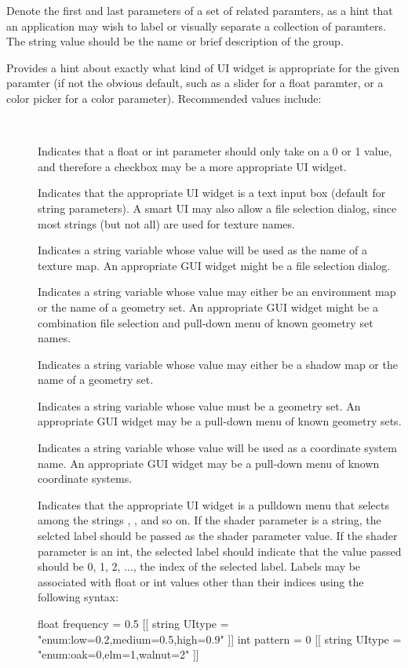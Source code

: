 \documentclass[11pt,letterpaper]{book}
\def\color{{\cf color}\xspace}
\def\float{{\cf float}\xspace}
\def\inttype{{\cf int}\xspace}
\begin{document}
Denote the first and last parameters of a set of related paramters, as a
hint that an application may wish to label or visually separate a
collection of paramters.  The string value should be the name or brief
description of the group.
\apiend

Provides a hint about exactly what kind of UI widget is appropriate for
the given paramter (if not the obvious default, such as a slider for a
\float paramter, or a color picker for a \color parameter).  Recommended
values include:

\vspace{-12pt}
\begin{description}
\item[] \spc
\item[\rm \halfspc ~ ] Indicates that a \float or {\cf int}
  parameter should only take on a 0 or 1 value, and therefore a checkbox
  may be a more appropriate UI widget.
\item[\rm {}] Indicates that the appropriate UI widget is a text
  input box (default for string parameters).  A smart UI may also allow
  a file selection dialog, since most strings (but not all) are used
  for texture names.
\item[\rm {}] Indicates a string variable whose value will be
  used as the name of a texture map.  An appropriate GUI widget might
  be a file selection dialog.
\item[\rm {}] Indicates a string variable whose value may
  either be an environment map or the name of a geometry set.  An
  appropriate GUI widget might be a combination file selection and
  pull-down menu of known geometry set names.
\item[\rm {}] Indicates a string variable whose value may
  either be a shadow map or the name of a geometry set.
\item[\rm {}] Indicates a string variable whose value must
  be a geometry set.  An appropriate GUI widget may be a pull-down
  menu of known geometry sets.
\item[\rm {}] Indicates a string variable whose value will be
  used as a coordinate system name.  An appropriate GUI widget may be
  a pull-down menu of known coordinate systems.
\item[\rm {}] Indicates that the appropriate UI
  widget is a pulldown menu that selects among the strings ,
  , and so on.
  If the shader parameter is a {\cf string}, the selcted label should be
  passed as the shader parameter value.  If the shader parameter is an
  \inttype, the selected label should indicate that the value passed
  should be 0, 1, 2, ..., the index of the selected label.
  Labels may be associated with \float or {\cf int} values other than
  their indices using the following syntax:
  \begin{code}
    float frequency = 0.5
        [[ string UItype = "enum:low=0.2,medium=0.5,high=0.9" ]]
    int pattern = 0
        [[ string UItype = "enum:oak=0,elm=1,walnut=2" ]]
  \end{code}
\end{description}
\end{document}
